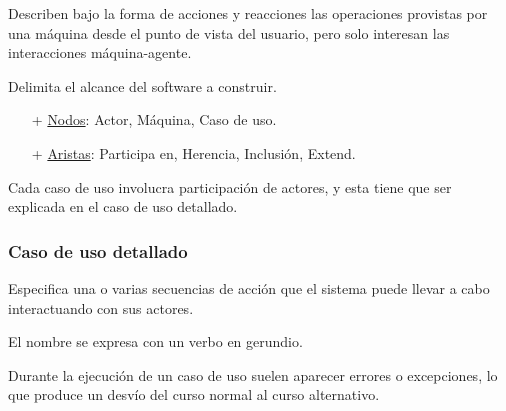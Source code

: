   Describen bajo la forma de acciones y reacciones las operaciones provistas por una m\'aquina desde el punto de vista del usuario, pero solo interesan las interacciones m\'aquina-agente. 
  
  Delimita el alcance del software a construir. 
  
  
  \begin{itemize}
    \item[+] \underline{Nodos}: Actor, M\'aquina, Caso de uso. 
    \item[+] \underline{Aristas}: Participa en, Herencia, Inclusi\'on, Extend. 
  \end{itemize}
  
  Cada caso de uso involucra participaci\'on de actores, y esta tiene que ser explicada en el caso de uso detallado. 
  
  \subsubsection*{Caso de uso detallado} 
  
  Especifica una o varias secuencias de acci\'on que el sistema puede llevar a cabo interactuando con sus actores. 
  
  El nombre se expresa con un verbo en gerundio. 
  
  \begin{casodeuso}
  \end{casodeuso}

  \begin{casodeuso}
  \end{casodeuso}
  
  Durante la ejecuci\'on de un caso de uso suelen aparecer errores o excepciones, lo que produce un desv\'io del curso normal al curso alternativo. 
  
